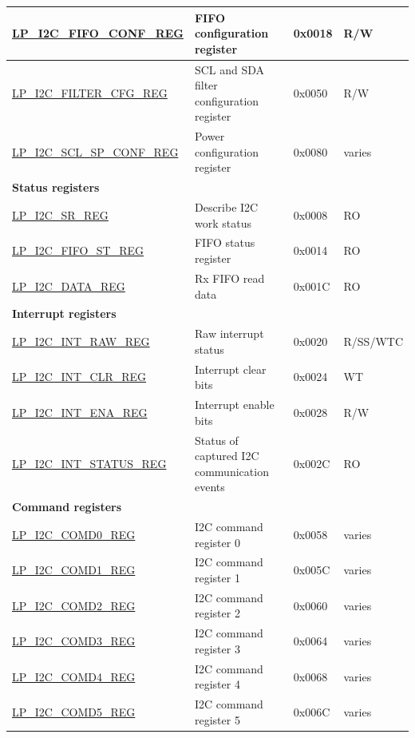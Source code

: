 \begin{longtable}{ | p{6cm} | p{7.2cm} | p{1.3cm} | p{1cm} | }
\hyperref[regdesc:LPI2CFIFOCONFREG]{LP\_I2C\_FIFO\_CONF\_REG} & FIFO configuration register & 0x0018 & R/W \\ \hline
\hyperref[regdesc:LPI2CFILTERCFGREG]{LP\_I2C\_FILTER\_CFG\_REG} & SCL and SDA filter configuration register & 0x0050 & R/W \\ \hline
\hyperref[regdesc:LPI2CSCLSPCONFREG]{LP\_I2C\_SCL\_SP\_CONF\_REG} & Power configuration register & 0x0080 & varies \\ \hline
\multicolumn{4}{|l|}{\textbf{Status registers}} \\ \hline
\hyperref[regdesc:LPI2CSRREG]{LP\_I2C\_SR\_REG} & Describe I2C work status & 0x0008 & RO \\ \hline
\hyperref[regdesc:LPI2CFIFOSTREG]{LP\_I2C\_FIFO\_ST\_REG} & FIFO status register & 0x0014 & RO \\ \hline
\hyperref[regdesc:LPI2CDATAREG]{LP\_I2C\_DATA\_REG} & Rx FIFO read data & 0x001C & RO \\ \hline
\multicolumn{4}{|l|}{\textbf{Interrupt registers}} \\ \hline
\hyperref[regdesc:LPI2CINTRAWREG]{LP\_I2C\_INT\_RAW\_REG} & Raw interrupt status & 0x0020 & R/SS/WTC \\ \hline
\hyperref[regdesc:LPI2CINTCLRREG]{LP\_I2C\_INT\_CLR\_REG} & Interrupt clear bits & 0x0024 & WT \\ \hline
\hyperref[regdesc:LPI2CINTENAREG]{LP\_I2C\_INT\_ENA\_REG} & Interrupt enable bits & 0x0028 & R/W \\ \hline
\hyperref[regdesc:LPI2CINTSTATUSREG]{LP\_I2C\_INT\_STATUS\_REG} & Status of captured I2C communication events & 0x002C & RO \\ \hline
\multicolumn{4}{|l|}{\textbf{Command registers}} \\ \hline
\hyperref[regdesc:LPI2CCOMD0REG]{LP\_I2C\_COMD0\_REG} & I2C command register 0 & 0x0058 & varies \\ \hline
\hyperref[regdesc:LPI2CCOMD1REG]{LP\_I2C\_COMD1\_REG} & I2C command register 1 & 0x005C & varies \\ \hline
\hyperref[regdesc:LPI2CCOMD2REG]{LP\_I2C\_COMD2\_REG} & I2C command register 2 & 0x0060 & varies \\ \hline
\hyperref[regdesc:LPI2CCOMD3REG]{LP\_I2C\_COMD3\_REG} & I2C command register 3 & 0x0064 & varies \\ \hline
\hyperref[regdesc:LPI2CCOMD4REG]{LP\_I2C\_COMD4\_REG} & I2C command register 4 & 0x0068 & varies \\ \hline
\hyperref[regdesc:LPI2CCOMD5REG]{LP\_I2C\_COMD5\_REG} & I2C command register 5 & 0x006C & varies \\ \hline

\end{longtable}
